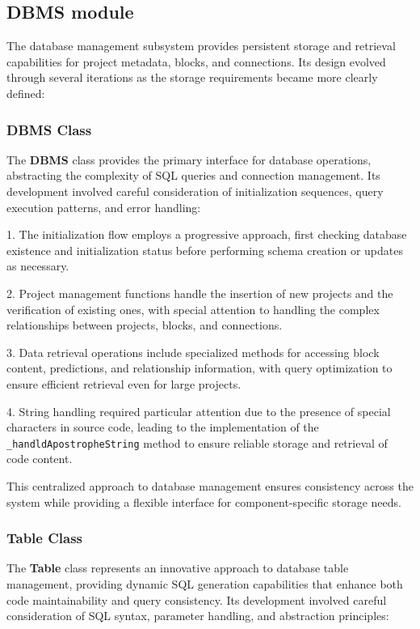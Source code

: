\subsection{DBMS module}

The database management subsystem provides persistent storage and retrieval capabilities for project metadata, blocks, and connections. Its design evolved through several iterations as the storage requirements became more clearly defined:

\subsubsection{DBMS Class}

The \textbf{DBMS} class provides the primary interface for database operations, abstracting the complexity of SQL queries and connection management. Its development involved careful consideration of initialization sequences, query execution patterns, and error handling:

1. The initialization flow employs a progressive approach, first checking database existence and initialization status before performing schema creation or updates as necessary.

2. Project management functions handle the insertion of new projects and the verification of existing ones, with special attention to handling the complex relationships between projects, blocks, and connections.

3. Data retrieval operations include specialized methods for accessing block content, predictions, and relationship information, with query optimization to ensure efficient retrieval even for large projects.

4. String handling required particular attention due to the presence of special characters in source code, leading to the implementation of the \texttt{\_handldApostropheString} method to ensure reliable storage and retrieval of code content.

This centralized approach to database management ensures consistency across the system while providing a flexible interface for component-specific storage needs.

\subsubsection{Table Class}

The \textbf{Table} class represents an innovative approach to database table management, providing dynamic SQL generation capabilities that enhance both code maintainability and query consistency. Its development involved careful consideration of SQL syntax, parameter handling, and abstraction principles:


